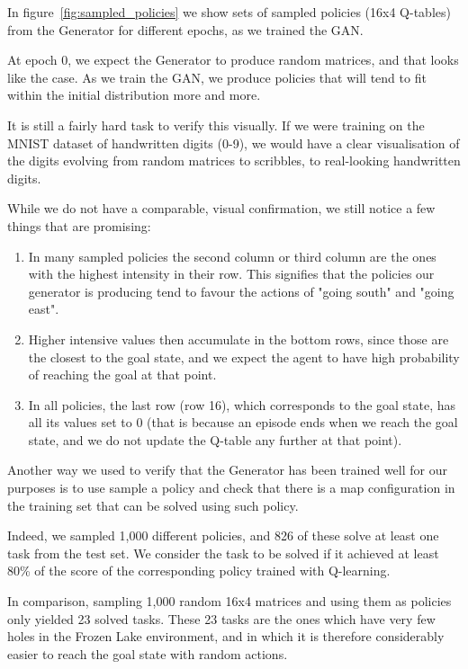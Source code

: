 In figure~\ref{fig:sampled_policies} we show sets of sampled policies (16x4 Q-tables) from the Generator for different epochs, as we trained the GAN.

At epoch 0, we expect the Generator to produce random matrices, and that looks like the case. As we train the GAN, we produce policies that will tend to fit within the initial distribution more and more.

It is still a fairly hard task to verify this visually. If we were training on the MNIST dataset of handwritten digits (0-9), we would have a clear visualisation of the digits evolving from random matrices to scribbles, to real-looking handwritten digits.

While we do not have a comparable, visual confirmation, we still notice a few things that are promising:
\begin{enumerate}
	\item In many sampled policies the second column or third column are the ones with the highest intensity in their row. This signifies that the policies our generator is producing tend to favour the actions of "going south" and "going east".
	\item Higher intensive values then accumulate in the bottom rows, since those are the closest to the goal state, and we expect the agent to have high probability of reaching the goal at that point.
	\item In all policies, the last row (row 16), which corresponds to the goal state, has all its values set to 0 (that is because an episode ends when we reach the goal state, and we do not update the Q-table any further at that point).
\end{enumerate}

Another way we used to verify that the Generator has been trained well for our purposes is to use sample a policy and check that there is a map configuration in the training set that can be solved using such policy.

Indeed, we sampled 1,000 different policies, and 826 of these solve at least one task from the test set. We consider the task to be solved if it achieved at least 80\% of the score of the corresponding policy trained with Q-learning.

In comparison, sampling 1,000 random 16x4 matrices and using them as policies only yielded 23 solved tasks. These 23 tasks are the ones which have very few holes in the Frozen Lake environment, and in which it is therefore considerably easier to reach the goal state with random actions.

